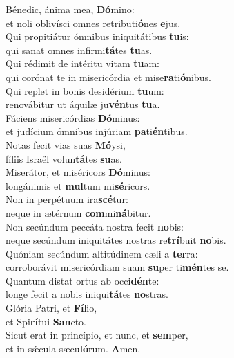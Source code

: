 \evenverse Bénedic, ánima mea, \textbf{Dó}mino:~\*\\
\evenverse et noli oblivísci omnes retributi\textbf{ó}nes \textbf{e}jus.\\
\oddverse Qui propitiátur ómnibus iniquitátibus \textbf{tu}is:~\*\\
\oddverse qui sanat omnes infirmi\textbf{tá}tes \textbf{tu}as.\\
\evenverse Qui rédimit de intéritu vitam \textbf{tu}am:~\*\\
\evenverse qui corónat te in misericórdia et mise\textbf{ra}ti\textbf{ó}nibus.\\
\oddverse Qui replet in bonis desidérium \textbf{tu}um:~\*\\
\oddverse renovábitur ut áquilæ ju\textbf{vén}tus \textbf{tu}a.\\
\evenverse Fáciens misericórdias \textbf{Dó}minus:~\*\\
\evenverse et judícium ómnibus injúriam \textbf{pa}ti\textbf{én}tibus.\\
\oddverse Notas fecit vias suas \textbf{Mó}ysi,~\*\\
\oddverse fíliis Israël volun\textbf{tá}tes \textbf{su}as.\\
\evenverse Miserátor, et miséricors \textbf{Dó}minus:~\*\\
\evenverse longánimis et \textbf{mul}tum mi\textbf{sé}ricors.\\
\oddverse Non in perpétuum ira\textbf{scé}tur:~\*\\
\oddverse neque in ætérnum \textbf{com}mi\textbf{ná}bitur.\\
\evenverse Non secúndum peccáta nostra fecit \textbf{no}bis:~\*\\
\evenverse neque secúndum iniquitátes nostras re\textbf{trí}buit \textbf{no}bis.\\
\oddverse Quóniam secúndum altitúdinem cæli a \textbf{ter}ra:~\*\\
\oddverse corroborávit misericórdiam suam \textbf{su}per ti\textbf{mén}tes se.\\
\evenverse Quantum distat ortus ab occi\textbf{dén}te:~\*\\
\evenverse longe fecit a nobis iniqui\textbf{tá}tes \textbf{no}stras.\\
\oddverse Glória Patri, et \textbf{Fí}lio,~\*\\
\oddverse et Spi\textbf{rí}tui \textbf{San}cto.\\
\evenverse Sicut erat in princípio, et nunc, et \textbf{sem}per,~\*\\
\evenverse et in sǽcula sæcu\textbf{ló}rum. \textbf{A}men.\\
